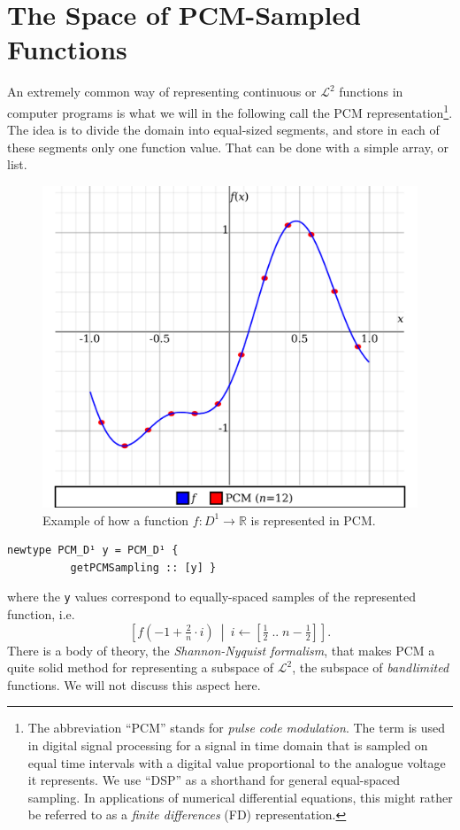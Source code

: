 \documentclass[sigplan,screen]{acmart}
\theoremstyle{acmplain}
\theoremstyle{acmdefinition}
\begin{document}
\section{The Space of PCM-Sampled Functions}
An extremely common way of representing continuous or $\mathcal{L}^2$ functions in computer programs is what we will in the following call the PCM representation\footnote{%
The abbreviation “PCM” stands for \emph{pulse code modulation}. The term is used in digital signal processing for a signal in time domain that is sampled on equal time intervals with a digital value proportional to the analogue voltage it represents. We use “DSP” as a shorthand for general equal-spaced sampling. In applications of numerical differential equations, this might rather be referred to as a \emph{finite differences} (FD) representation.
}. The idea is to divide the domain into equal-sized segments, and store in each of these segments only one function value. That can be done with a simple array, or list.
\begin{figure}
 \centering
 \includegraphics[width=\linewidth]{simple-PCM-example.pdf}
 \caption{Example of how a function $f:D^1\to\mathbb{R}$ is represented in PCM.}
 \label{haarDomDecompose}
\end{figure}
\begin{lstlisting}[xleftmargin=1.5em]
newtype PCM_D¹ y = PCM_D¹ {
          getPCMSampling :: [y] }
\end{lstlisting}
where the \lstinline`y` values correspond to equally-spaced samples of the represented function, i.e.
\[
  \left[f(-1 + \tfrac2n\cdot i)\ \middle|\ i\leftarrow[\tfrac12\;..\;n-\tfrac12]\right].
\]
There is a body of theory, the \emph{Shannon-Nyquist formalism}, that makes PCM a quite solid method for representing a subspace of $\mathcal{L}^2$, the subspace of \emph{bandlimited} functions. We will not discuss this aspect here. 
\end{document}

